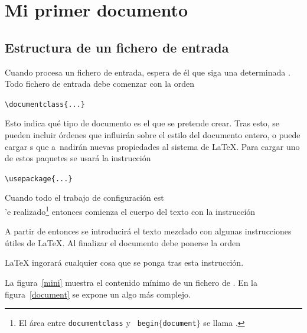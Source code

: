 \section{Mi primer documento}
\subsection{Estructura de un fichero de entrada}

Cuando \LaTeXe{} procesa un fichero de entrada, espera de \'el que
siga una determinada . Todo fichero de entrada debe
comenzar con la orden
\begin{code}
\lstinline+\documentclass{...}+
\end{code}
Esto indica qu\'e tipo de documento es el que se pretende crear.
Tras esto, se pueden incluir \'ordenes que influir\'an sobre el
estilo del documento entero, o puede cargar s que
a~nadir\'an nuevas propiedades al sistema de \LaTeX. Para cargar
uno de estos paquetes se usar\'a la instrucci\'on
\begin{code}
\lstinline+\usepackage{...}+
\end{code}

Cuando todo el trabajo de configuraci\'on est\\'e
realizado\footnote{El
  \'area entre \texttt{\bs documentclass} y \texttt{\bs
    begin$\mathtt{\{}$document$\mathtt{\}}$} se llama
  \emph{}.} entonces comienza el cuerpo del texto con
la instrucci\'on
\begin{code}
\lstinline||
\end{code}

A partir de entonces se introducir\'a el texto mezclado con algunas
instrucciones \'utiles de \LaTeX. Al finalizar el documento debe
ponerse la orden
\begin{code}
\lstinline||
\end{code}
LaTeX{} ingorar\'a cualquier cosa que se ponga tras esta
instrucci\'on.

La figura~\ref{mini} muestra el contenido m\'inimo de un fichero de
\LaTeXe. En la figura~\ref{document} se expone un  algo m\'as complejo.

\begin{example}
%
%
\end{example}

